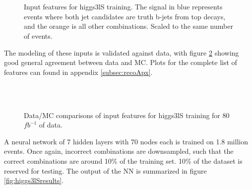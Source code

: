 \begin{figure}[h!]
    \\
    \\
    \caption{Input features for higgs3lS training. The signal in blue represents events where both jet candidates are truth b-jets from top decays, and the orange is all other combinations. Scaled to the same number of events.}
    \label{fig:features_higgs3lS}
\end{figure}

The modeling of these inputs is validated against data, with figure \ref{fig:model_higgs3lS} showing good general agreement between data and MC. Plots for the complete list of features can found in appendix \ref{subsec:recoApx}.

\begin{figure}[h!]
    \\
    \\
    \caption{Data/MC comparisons of input features for higgs3lS training for 80 $fb^{-1}$ of data.}
    \label{fig:model_higgs3lS}
\end{figure} 

A neural network of 7 hidden layers with 70 nodes each is trained on 1.8 million events. Once again, incorrect combinations are downsampled, such that the correct combinations are around 10\% of the training set. 10\% of the dataset is reserved for testing. The output of the NN is summarized in figure \ref{fig:higgs3lSresults}.

